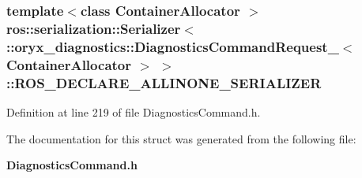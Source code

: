 \subsubsection[{\-R\-O\-S\-\_\-\-D\-E\-C\-L\-A\-R\-E\-\_\-\-A\-L\-L\-I\-N\-O\-N\-E\-\_\-\-S\-E\-R\-I\-A\-L\-I\-Z\-E\-R}]{\setlength{\rightskip}{0pt plus 5cm}template$<$class Container\-Allocator $>$ ros\-::serialization\-::\-Serializer$<$ \-::{\bf oryx\-\_\-diagnostics\-::\-Diagnostics\-Command\-Request\-\_\-}$<$ \-Container\-Allocator $>$ $>$\-::{\bf \-R\-O\-S\-\_\-\-D\-E\-C\-L\-A\-R\-E\-\_\-\-A\-L\-L\-I\-N\-O\-N\-E\-\_\-\-S\-E\-R\-I\-A\-L\-I\-Z\-E\-R}}\label{structros_1_1serialization_1_1Serializer_3_01_1_1oryx__diagnostics_1_1DiagnosticsCommandRequest_6c568f0abfd80cbe862c3f3c749801ee_aea594579f7586abf9aa9ed349e817f4a}


\-Definition at line 219 of file \-Diagnostics\-Command.\-h.



\-The documentation for this struct was generated from the following file\-:\begin{DoxyCompactItemize}
\item 
{\bf \-Diagnostics\-Command.\-h}\end{DoxyCompactItemize}
